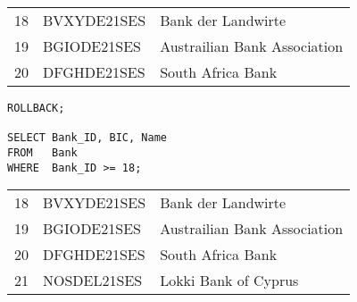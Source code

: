 \begin{center}
    \begin{small}
        \tablehead{}
        \begin{msoraclesql}
            \begin{supertabular}{rll}
                18 & BVXYDE21SES & Bank der Landwirte \\
                19 & BGIODE21SES & Austrailian Bank Association \\
                20 & DFGHDE21SES & South Africa Bank \\
            \end{supertabular}
        \end{msoraclesql}
    \end{small}
\end{center}
\begin{lstlisting}[language=oracle_sql,label=sql07_30]
ROLLBACK;

SELECT Bank_ID, BIC, Name
FROM   Bank
WHERE  Bank_ID >= 18;
          \end{lstlisting}
\begin{center}
    \begin{small}
        \tablehead{}
        \begin{msoraclesql}
            \begin{supertabular}{rll}
                18 & BVXYDE21SES & Bank der Landwirte \\
                19 & BGIODE21SES & Austrailian Bank Association \\
                20 & DFGHDE21SES & South Africa Bank \\
                21 & NOSDEL21SES & Lokki Bank of Cyprus \\
            \end{supertabular}
        \end{msoraclesql}
    \end{small}
\end{center}
